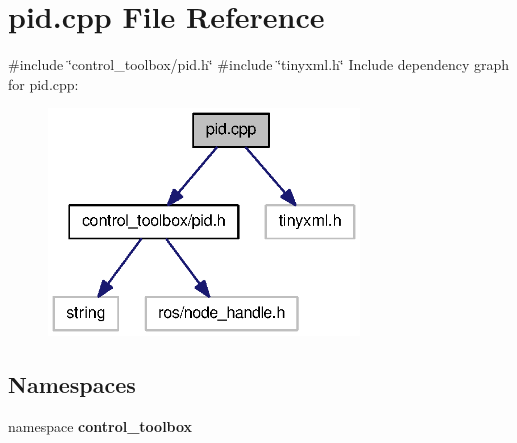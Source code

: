 \section{pid.\-cpp \-File \-Reference}
\label{pid_8cpp}
{\ttfamily \#include \char`\"{}control\-\_\-toolbox/pid.\-h\char`\"{}}\*
{\ttfamily \#include \char`\"{}tinyxml.\-h\char`\"{}}\*
\-Include dependency graph for pid.\-cpp\-:
\nopagebreak
\begin{figure}[H]
\begin{center}
\leavevmode
\includegraphics[width=234pt]{pid_8cpp__incl}
\end{center}
\end{figure}
\subsection*{\-Namespaces}
\begin{DoxyCompactItemize}
\item 
namespace {\bf control\-\_\-toolbox}
\end{DoxyCompactItemize}

